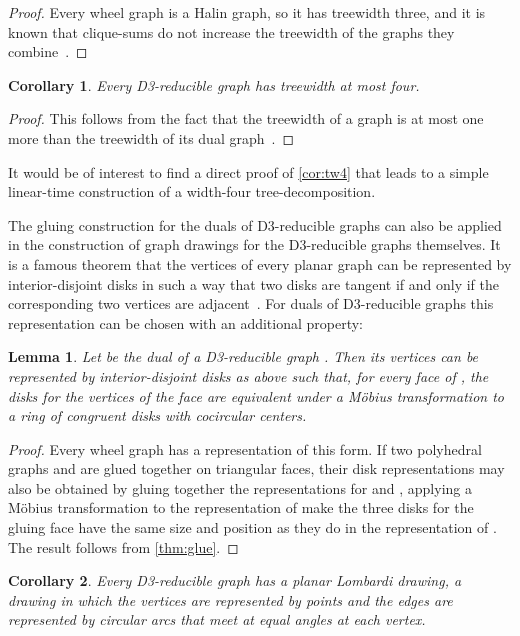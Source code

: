 \documentclass{article}
\newtheorem{lemma}{Lemma}
\newtheorem{corollary}{Corollary}
\begin{document}
\begin{proof}
Every wheel graph is a Halin graph, so it has treewidth three, and it is known that clique-sums do not increase the treewidth of the graphs they combine~\cite{Lov-BAMS-06}.
\end{proof}

\begin{corollary}
\label{cor:tw4}
Every D3-reducible graph has treewidth at most four.
\end{corollary}

\begin{proof}
This follows from the fact that the treewidth of a graph is at most one more than the treewidth of its dual graph~\cite{BouMazTod-DM-03}.
\end{proof}

It would be of interest to find a direct proof of \autoref{cor:tw4} that leads to a simple linear-time construction of a width-four tree-decomposition.

The gluing construction for the duals of D3-reducible graphs can also be applied in the construction of graph drawings for the D3-reducible graphs themselves. It is a famous theorem that the vertices of every planar graph can be represented by interior-disjoint disks in such a way that two disks are tangent if and only if the corresponding two vertices are adjacent~\cite{Ste-ICP-05}. For duals of D3-reducible graphs this representation can be chosen with an additional property:

\begin{lemma}
\label{lem:cpack}
Let  be the dual of a D3-reducible graph . Then its vertices can be represented by interior-disjoint disks as above such that, for every face of , the disks for the vertices of the face are equivalent under a M\"obius transformation to a ring of  congruent disks with cocircular centers.
\end{lemma}

\begin{proof}
Every wheel graph has a representation of this form. If two polyhedral graphs  and  are glued together on triangular faces, their disk representations may also be obtained by gluing together the representations for  and , applying a M\"obius transformation to the representation of  make the three disks for the gluing face have the same size and position as they do in the representation of .  The result follows from \autoref{thm:glue}.
\end{proof}

\begin{corollary}
Every D3-reducible graph has a planar \emph{Lombardi drawing}, a drawing in which the vertices are represented by points and the edges are represented by circular arcs that meet at equal angles at each vertex.
\end{corollary}
\end{document}
